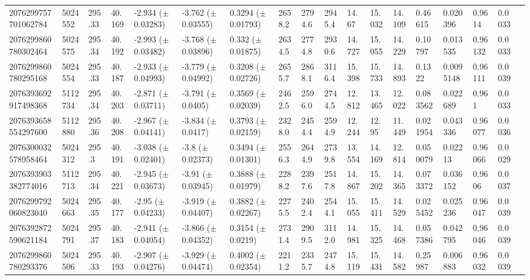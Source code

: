 \begin{sidewaystable}[htbp]
{\begin{tabular}{llllllllllllllllll}
            2076299757701062784 & 5024552 & 295.33 & 40.169 & -2.934 ($\pm$ 0.03283) & -3.762 ($\pm$ 0.03555) & 0.3294 ($\pm$ 0.01793) & 2658.2 & 2794.6 & 2945.4 & 14.67 & 15.032 & 14.109 & 0.46615 & 0.020396 & 0.9614 & 0.0033 & \\
            2076299860780302464 & 5024575 & 295.34 & 40.192 & -2.993 ($\pm$ 0.03482) & -3.768 ($\pm$ 0.03896) & 0.332 ($\pm$ 0.01875) & 2634.5 & 2774.8 & 2930.6 & 14.727 & 15.055 & 14.229 & 0.10797 & 0.013535 & 0.96132 & 0.0033 & \\
            2076299860780295168 & 5024554 & 295.33 & 40.187 & -2.933 ($\pm$ 0.04993) & -3.779 ($\pm$ 0.04992) & 0.3208 ($\pm$ 0.02726) & 2655.7 & 2868.1 & 3116.4 & 15.398 & 15.733 & 14.893 & 0.1322 & 0.0095148 & 0.96111 & 0.0039 & \\
            2076393692917498368 & 5112734 & 295.34 & 40.203 & -2.871 ($\pm$ 0.03711) & -3.791 ($\pm$ 0.0405) & 0.3569 ($\pm$ 0.02039) & 2462.5 & 2596.0 & 2744.5 & 12.812 & 13.465 & 12.022 & 0.083562 & 0.022689 & 0.961 & 0.0033 & \\
            2076393658554297600 & 5112880 & 295.36 & 40.208 & -2.967 ($\pm$ 0.04141) & -3.834 ($\pm$ 0.0417) & 0.3793 ($\pm$ 0.02159) & 2328.0 & 2454.4 & 2594.9 & 12.244 & 12.95 & 11.449 & 0.021954 & 0.043336 & 0.96077 & 0.0036 & \\
            2076300032578958464 & 5024312 & 295.3 & 40.191 & -3.038 ($\pm$ 0.02401) & -3.8 ($\pm$ 0.02373) & 0.3494 ($\pm$ 0.01301) & 2556.3 & 2644.9 & 2739.8 & 13.554 & 14.169 & 12.814 & 0.050079 & 0.02213 & 0.96066 & 0.0029 & \\
            2076393903382774016 & 5112713 & 295.34 & 40.221 & -2.945 ($\pm$ 0.03673) & -3.91 ($\pm$ 0.03945) & 0.3888 ($\pm$ 0.01979) & 2288.2 & 2397.6 & 2517.8 & 14.867 & 15.202 & 14.365 & 0.073372 & 0.036152 & 0.9606 & 0.0037 & \\
            2076299792060823040 & 5024663 & 295.35 & 40.177 & -2.95 ($\pm$ 0.04233) & -3.919 ($\pm$ 0.04407) & 0.3882 ($\pm$ 0.02267) & 2275.5 & 2402.4 & 2544.1 & 15.055 & 15.411 & 14.529 & 0.025452 & 0.025236 & 0.96047 & 0.0039 & \\
            2076392872590621184 & 5024791 & 295.37 & 40.183 & -2.941 ($\pm$ 0.04054) & -3.866 ($\pm$ 0.04352) & 0.3154 ($\pm$ 0.0219) & 2731.4 & 2909.5 & 3112.0 & 14.981 & 15.325 & 14.468 & 0.057386 & 0.042795 & 0.96046 & 0.0039 & \\
            2076299860780293376 & 5024506 & 295.33 & 40.193 & -2.907 ($\pm$ 0.04276) & -3.929 ($\pm$ 0.04474) & 0.4002 ($\pm$ 0.02354) & 2211.2 & 2335.7 & 2474.8 & 15.119 & 15.431 & 14.582 & 0.25987 & 0.006883 & 0.96032 & 0.0039 & \\

\end{tabular}}
\end{sidewaystable}
